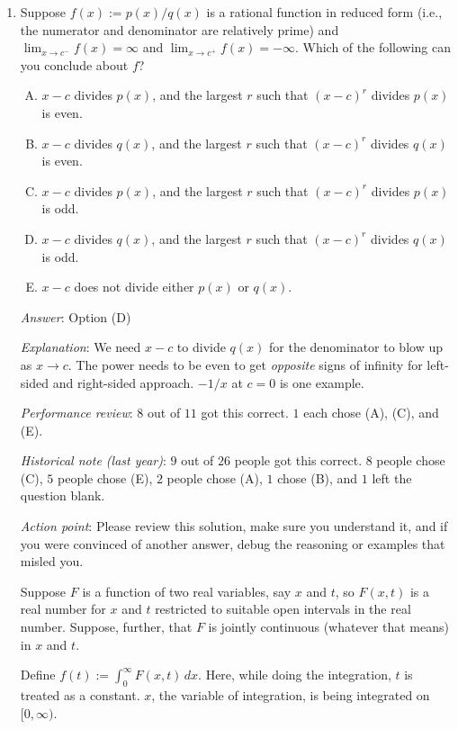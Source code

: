 \documentclass[10pt]{amsart}
\begin{document}
\begin{enumerate}
\item Suppose $f(x) := p(x)/q(x)$ is a rational function in reduced
  form (i.e., the numerator and denominator are relatively prime) and
  $\lim_{x \to c^-} f(x) = \infty$ and $\lim_{x \to c^+} f(x) =
  -\infty$. Which of the following can you conclude about $f$?
  \begin{enumerate}[(A)]
  \item $x - c$ divides $p(x)$, and the largest $r$ such that $(x -
    c)^r$ divides $p(x)$ is even.
  \item $x - c$ divides $q(x)$, and the largest $r$ such that $(x -
    c)^r$ divides $q(x)$ is even.
  \item $x - c$ divides $p(x)$, and the largest $r$ such that $(x -
    c)^r$ divides $p(x)$ is odd.
  \item $x - c$ divides $q(x)$, and the largest $r$ such that $(x -
    c)^r$ divides $q(x)$ is odd.
  \item $x - c$ does not divide either $p(x)$ or $q(x)$.
  \end{enumerate}

  {\em Answer}: Option (D)

  {\em Explanation}: We need $x - c$ to divide $q(x)$ for the
  denominator to blow up as $x \to c$. The power needs to be even to
  get {\em opposite} signs of infinity for left-sided and
  right-sided approach. $-1/x$ at $c = 0$ is one example.

  {\em Performance review}: $8$ out of $11$ got this correct. $1$ each
  chose (A), (C), and (E).

  {\em Historical note (last year)}: $9$ out of $26$ people got this
  correct. $8$ people chose (C), $5$ people chose (E), $2$ people
  chose (A), $1$ chose (B), and $1$ left the question blank.

  {\em Action point}: Please review this solution, make sure you
  understand it, and if you were convinced of another answer, debug
  the reasoning or examples that misled you.

  Suppose $F$ is a function of two real variables, say $x$
  and $t$, so $F(x,t)$ is a real number for $x$ and $t$ restricted to
  suitable open intervals in the real number. Suppose, further, that
  $F$ is jointly continuous (whatever that means) in $x$ and $t$.

  Define $f(t) := \int_0^\infty F(x,t) \, dx$. Here, while doing the
  integration, $t$ is treated as a constant. $x$, the variable of
  integration, is being integrated on $[0,\infty)$.
    

\end{enumerate}
\end{document}
